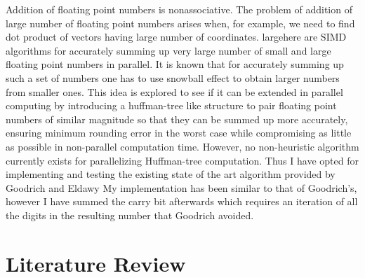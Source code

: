 \documentclass[11pt]{article}       %
\begin{document}
Addition of floating point numbers is nonassociative. The problem of addition of large number of floating point numbers arises when, for example, we need to find dot product of vectors having large number of coordinates. largehere are SIMD algorithms for accurately summing up very large number of small and large floating point numbers in parallel. It is known that for accurately summing up such a set of numbers one has to use snowball effect to obtain larger numbers from smaller ones. This idea is explored to see if it can be extended in parallel computing by introducing a huffman-tree like structure to pair floating point numbers of similar magnitude so that they can be summed up more accurately, ensuring minimum rounding error in the worst case while compromising as little as possible in non-parallel computation time. However, no non-heuristic algorithm currently exists for parallelizing Huffman-tree computation. Thus I have opted for implementing and testing the existing state of the art algorithm provided by Goodrich and Eldawy \cite{PASFPN} My implementation has been similar to that of Goodrich's, however I have summed the carry bit afterwards which requires an iteration of all the digits in the resulting number that Goodrich avoided.


\section{Literature Review} \label{litrev}
\end{document}
